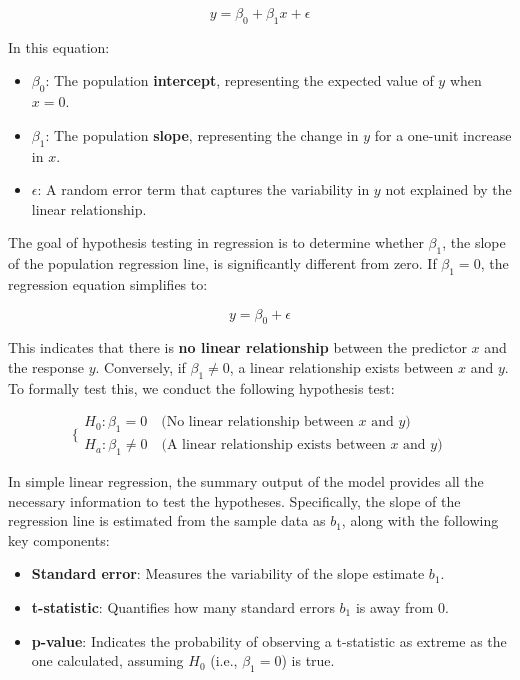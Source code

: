 \documentclass[
]{book}
\providecommand{\tightlist}{%
  \setlength{\itemsep}{0pt}\setlength{\parskip}{0pt}}
\theoremstyle{definition}
\theoremstyle{definition}
\theoremstyle{definition}
\theoremstyle{definition}
\theoremstyle{remark}
\begin{document}
\[
y = \beta_0 + \beta_1x + \epsilon
\]

In this equation:

\begin{itemize}
\tightlist
\item
  \(\beta_0\): The population \textbf{intercept}, representing the expected value of \(y\) when \(x = 0\).\\
\item
  \(\beta_1\): The population \textbf{slope}, representing the change in \(y\) for a one-unit increase in \(x\).\\
\item
  \(\epsilon\): A random error term that captures the variability in \(y\) not explained by the linear relationship.
\end{itemize}

The goal of hypothesis testing in regression is to determine whether \(\beta_1\), the slope of the population regression line, is significantly different from zero. If \(\beta_1 = 0\), the regression equation simplifies to:

\[
y = \beta_0 + \epsilon
\]

This indicates that there is \textbf{no linear relationship} between the predictor \(x\) and the response \(y\). Conversely, if \(\beta_1 \neq 0\), a linear relationship exists between \(x\) and \(y\). To formally test this, we conduct the following hypothesis test:

\[
\bigg\{
\begin{matrix}
  H_0: \beta_1 =  0 \quad \text{(No linear relationship between \(x\) and \(y\))} \qquad  \\
  H_a: \beta_1 \neq 0 \quad \text{(A linear relationship exists between \(x\) and \(y\))} 
\end{matrix}
\]

In simple linear regression, the summary output of the model provides all the necessary information to test the hypotheses. Specifically, the slope of the regression line is estimated from the sample data as \(b_1\), along with the following key components:

\begin{itemize}
\tightlist
\item
  \textbf{Standard error}: Measures the variability of the slope estimate \(b_1\).\\
\item
  \textbf{t-statistic}: Quantifies how many standard errors \(b_1\) is away from 0.\\
\item
  \textbf{p-value}: Indicates the probability of observing a t-statistic as extreme as the one calculated, assuming \(H_0\) (i.e., \(\beta_1 = 0\)) is true.
\end{itemize}
\end{document}
